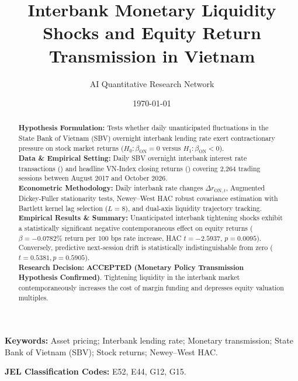 \documentclass{article}
\title{\textbf{Interbank Monetary Liquidity Shocks and Equity Return Transmission in Vietnam}}
\author[1*]{AI Quantitative Research Network}
\affil[1]{Autonomous Financial Machine Learning \& Empirical Econometrics Lab, Ho Chi Minh City, Vietnam}
\affil[*]{Contact: \texttt{research@vnresearch.org}}
\date{\today}
\begin{document}
\maketitle

\begin{abstract}
\noindent \textbf{Hypothesis Formulation:} Tests whether daily unanticipated fluctuations in the State Bank of Vietnam (SBV) overnight interbank lending rate exert contractionary pressure on stock market returns ($H_0: \beta_{\text{ON}} = 0$ versus $H_1: \beta_{\text{ON}} < 0$). \\
\textbf{Data \& Empirical Setting:} Daily SBV overnight interbank interest rate transactions () and headline VN-Index closing returns () covering 2,264 trading sessions between August 2017 and October 2026. \\
\textbf{Econometric Methodology:} Daily interbank rate changes $\Delta r_{\text{ON}, t}$, Augmented Dickey-Fuller stationarity tests, Newey--West HAC robust covariance estimation with Bartlett kernel lag selection ($L = 8$), and dual-axis liquidity trajectory tracking. \\
\textbf{Empirical Results \& Summary:} Unanticipated interbank tightening shocks exhibit a statistically significant negative contemporaneous effect on equity returns ($\beta = -0.0782$\% return per 100 bps rate increase, HAC $t = -2.5937$, $p = 0.0095$). Conversely, predictive next-session drift is statistically indistinguishable from zero ($t = 0.5381, p = 0.5905$). \\
\textbf{Research Decision:} \textbf{ACCEPTED (Monetary Policy Transmission Hypothesis Confirmed)}. Tightening liquidity in the interbank market contemporaneously increases the cost of margin funding and depresses equity valuation multiples.
\end{abstract}

\vspace{0.5em}
\noindent \textbf{Keywords:} Asset pricing; Interbank lending rate; Monetary transmission; State Bank of Vietnam (SBV); Stock returns; Newey--West HAC.

\vspace{0.5em}
\noindent \textbf{JEL Classification Codes:} E52, E44, G12, G15.

\newpage

\end{document}
